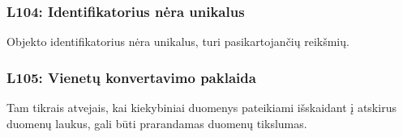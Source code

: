 \documentclass[letterpaper,10pt,lithuanian]{sphinxmanual}
\begin{document}
\subsubsection{L104: Identifikatorius nėra unikalus}
\label{\detokenize{branda:l104-identifikatorius-nera-unikalus}}\label{\detokenize{branda:l104}}
\sphinxAtStartPar
Objekto identifikatorius nėra unikalus, turi pasikartojančių reikšmių.


\subsubsection{L105: Vienetų konvertavimo paklaida}
\label{\detokenize{branda:l105-vienetu-konvertavimo-paklaida}}\label{\detokenize{branda:l105}}
\sphinxAtStartPar
Tam tikrais atvejais, kai kiekybiniai duomenys pateikiami išskaidant į atskirus
duomenų laukus, gali būti prarandamas duomenų tikslumas.
\end{document}
